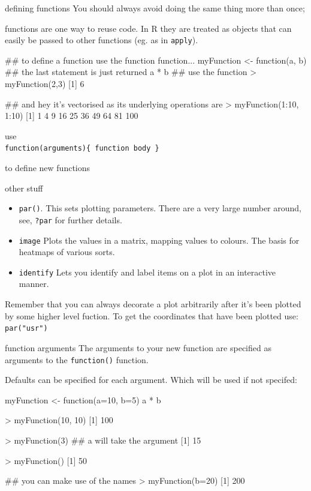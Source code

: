 \documentclass[pdf]{beamer}
\begin{document}
\begin{frame}[fragile]{defining functions}
  You should always avoid doing the same thing more than once;

  functions are one way to reuse code. In R they are treated
  as objects that can easily be passed to other functions
  (eg. as in \texttt{apply}).

  \begin{rcode}
    ## to define a function use the function function...
    myFunction <- function(a, b){
      ## the last statement is just returned
      a * b
    }
    ## use the function
    > myFunction(2,3)
    [1] 6

    ## and hey it's vectorised as its underlying operations are
    > myFunction(1:10, 1:10)
    [1]   1   4   9  16  25  36  49  64  81 100
  \end{rcode}

  use\\
  \hspace{4em} \verb|function(arguments){ function body }|

  to define new functions
\end{frame}

\begin{frame}{other stuff}
  \begin{itemize}
  \item \texttt{par()}. This sets plotting parameters. There are
    a very large number around, see, \texttt{?par} for further details.
  \item \texttt{image} Plots the values in a matrix, mapping values to
    colours. The basis for heatmaps of various sorts.
  \item \texttt{identify} Lets you identify and label items on a plot
    in an interactive manner.
 \end{itemize}
 
 Remember that you can always decorate a plot arbitrarily after it's
 been plotted by some higher level fuction. To get the coordinates that
 have been plotted use: \texttt{par("usr")}

\end{frame}

\begin{frame}[fragile]{function arguments}
  The arguments to your new function are specified as arguments
  to the \texttt{function()} function.

  Defaults can be specified for each argument. Which will be used
  if not specifed:

  \begin{rcode}
    myFunction <- function(a=10, b=5){
      a * b
    }
    
    > myFunction(10, 10)
    [1] 100

    > myFunction(3)  ## a will take the argument
    [1] 15

    > myFunction()
    [1] 50

    ## you can make use of the names
    > myFunction(b=20)
    [1] 200
  \end{rcode}
\end{frame}
\end{document}
